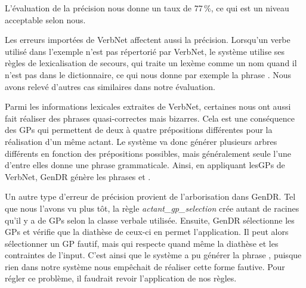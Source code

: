 L'évaluation de la précision nous donne un taux de 77\,\%, ce qui est un niveau acceptable selon nous.


Les erreurs importées de VerbNet affectent aussi la précision. Lorsqu'un verbe utilisé dans l'exemple n'est pas répertorié par VerbNet, le système utilise ses règles de lexicalisation  de secours, qui traite un lexème comme un nom quand il n'est pas dans le dictionnaire, ce qui nous donne par exemple la phrase \ungr{}. Nous avons relevé d'autres cas similaires dans notre évaluation.

Parmi les informations lexicales extraites de VerbNet, certaines nous ont aussi fait réaliser des phrases quasi-correctes mais bizarres. Cela est une conséquence des \acp{GP} qui permettent de deux à quatre prépositions différentes pour la réalisation d'un même actant. Le système va donc générer plusieurs arbres différents en fonction des prépositions possibles, mais généralement seule l'une d'entre elles donne une phrase grammaticale. Ainsi, en appliquant les\acp{GP} de VerbNet, GenDR génère les phrases  et \ungr{}.

Un autre type d'erreur de précision provient de l'arborisation dans GenDR. Tel que nous l'avons vu plus tôt, la règle \emph{actant\_gp\_selection} crée autant de racines qu'il y a de \acp{GP} selon la classe verbale utilisée. Ensuite, GenDR sélectionne les \acp{GP} et vérifie que la diathèse de ceux-ci en permet l'application. Il peut alors sélectionner un \ac{GP} fautif, mais qui respecte quand même la diathèse et les contraintes de l'input. C'est ainsi que le système a pu générer la phrase \ungr{}, puisque rien dans notre système nous empêchait de réaliser cette forme fautive. Pour régler ce problème, il faudrait revoir l'application de nos règles.

